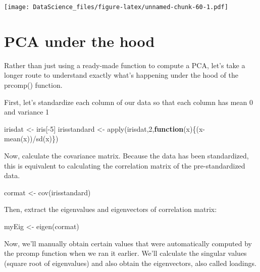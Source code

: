 \documentclass[
]{book}
\newenvironment{Shaded}{\begin{snugshade}}{\end{snugshade}}
\newcommand{\ControlFlowTok}[1]{\textcolor[rgb]{0.13,0.29,0.53}{\textbf{#1}}}
\newcommand{\DecValTok}[1]{\textcolor[rgb]{0.00,0.00,0.81}{#1}}
\newcommand{\FunctionTok}[1]{\textcolor[rgb]{0.00,0.00,0.00}{#1}}
\newcommand{\NormalTok}[1]{#1}
\newcommand{\OtherTok}[1]{\textcolor[rgb]{0.56,0.35,0.01}{#1}}
\newcommand{\SpecialCharTok}[1]{\textcolor[rgb]{0.00,0.00,0.00}{#1}}
\begin{document}
\texttt{[image: DataScience\_files/figure-latex/unnamed-chunk-60-1.pdf]}

\hypertarget{pca-under-the-hood}{%
\section{PCA under the hood}\label{pca-under-the-hood}}

Rather than just using a ready-made function to compute a PCA, let's take a longer route to understand exactly what's happening under the hood of the prcomp() function.

First, let's standardize each column of our data so that each column has mean 0 and variance 1

\begin{Shaded}
\begin{Highlighting}[]
\NormalTok{irisdat }\OtherTok{\textless{}{-}}\NormalTok{ iris[}\SpecialCharTok{{-}}\DecValTok{5}\NormalTok{]}
\NormalTok{irisstandard }\OtherTok{\textless{}{-}} \FunctionTok{apply}\NormalTok{(irisdat,}\DecValTok{2}\NormalTok{,}\ControlFlowTok{function}\NormalTok{(x)\{(x}\SpecialCharTok{{-}}\FunctionTok{mean}\NormalTok{(x))}\SpecialCharTok{/}\FunctionTok{sd}\NormalTok{(x)\})}
\end{Highlighting}
\end{Shaded}

Now, calculate the covariance matrix. Because the data has been standardized, this is equivalent to calculating the correlation matrix of the pre-standardized data.

\begin{Shaded}
\begin{Highlighting}[]
\NormalTok{cormat }\OtherTok{\textless{}{-}} \FunctionTok{cov}\NormalTok{(irisstandard)}
\end{Highlighting}
\end{Shaded}

Then, extract the eigenvalues and eigenvectors of correlation matrix:

\begin{Shaded}
\begin{Highlighting}[]
\NormalTok{myEig }\OtherTok{\textless{}{-}} \FunctionTok{eigen}\NormalTok{(cormat)}
\end{Highlighting}
\end{Shaded}

Now, we'll manually obtain certain values that were automatically computed by the prcomp function when we ran it earlier. We'll calculate the singular values (square root of eigenvalues) and also obtain the eigenvectors, also called loadings.
\end{document}
